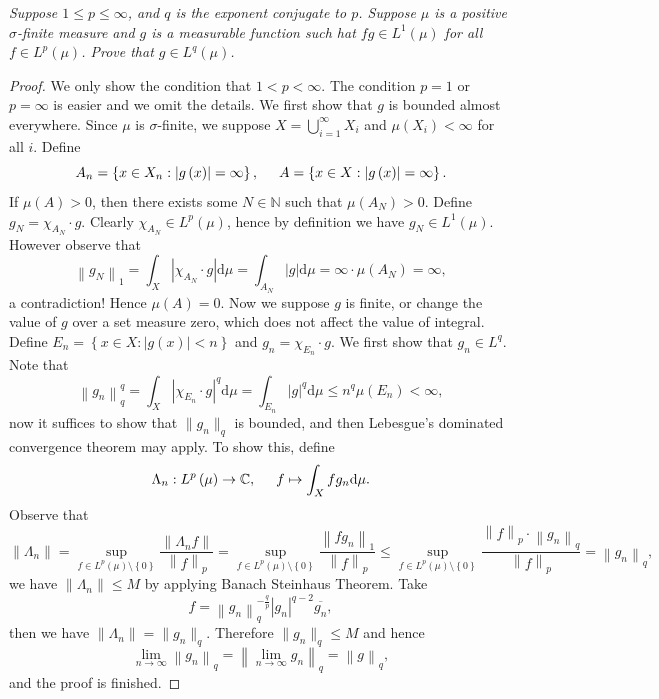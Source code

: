 \begin{problem}\em
Suppose $1\le p\le\infty$, and $q$ is the exponent conjugate to $p$. Suppose $\mu$ is a positive $\sigma$-finite measure and $g$ is a measurable function such hat $fg\in L^1(\mu)$ for all $f\in L^p(\mu)$. Prove that $g\in L^q(\mu)$.
\end{problem}
\begin{proof}
We only show the condition that $1<p<\infty$. The condition $p=1$ or $p=\infty$ is easier and we omit the details. We first show that $g$ is bounded almost everywhere. Since $\mu$ is $\sigma$-finite, we suppose $X=\bigcup_{i=1}^\infty X_i$ and $\mu(X_i)<\infty$ for all $i$. Define 
$$
A_n=\left\{ x\in X_n:\left| g\left( x \right) \right|=\infty \right\} ,\hspace{0.5cm}A=\left\{ x\in X:\left| g\left( x \right) \right|=\infty \right\} .
$$
If $\mu(A)>0$, then there exists some $N\in\mathbb{N}$ such that $\mu(A_N)>0$. Define $g_N=\chi_{A_N}\cdot g$. Clearly $\chi_{A_N}\in L^p(\mu)$, hence by definition we have $g_N\in L^1(\mu)$. However observe that 
$$
\left\| g_N \right\| _1=\int_X{\left| \chi _{A_N}\cdot g \right|\mathrm{d}\mu}=\int_{A_N}{\left| g \right|\mathrm{d}\mu}=\infty \cdot \mu \left( A_N \right) =\infty ,
$$
a contradiction! Hence $\mu(A)=0$. Now we suppose $g$ is finite, or change the value of $g$ over a set measure zero, which does not affect the value of integral. Define $E_n=\left\{ x\in X:\left| g\left( x \right) \right|<n\right\} $ and $g_n=\chi_{E_n}\cdot g$. We first show that $g_n\in L^q$. Note that 
$$
\left\| g_n \right\| _{q}^{q}=\int_X{\left| \chi _{E_n}\cdot g \right|^q\mathrm{d}\mu}=\int_{E_n}{\left| g \right|^q\mathrm{d}\mu}\le n^q\mu \left( E_n \right) <\infty ,
$$
now it suffices to show that $\|g_n\|_q$ is bounded, and then Lebesgue's dominated convergence theorem may apply. To show this, define 
$$
\Lambda_n :L^p\left( \mu \right) \rightarrow \mathbb{C} ,\hspace{0.5cm}f\mapsto \int_X{fg_n\mathrm{d}\mu}.
$$
Observe that 
$$
\left\| \Lambda _n \right\| =\mathop {\mathrm{sup}} \limits_{f\in L^p\left( \mu \right) \setminus \left\{ 0 \right\}}\frac{\left\| \Lambda _nf \right\|}{\left\| f \right\| _p}=\mathop {\mathrm{sup}} \limits_{f\in L^p\left( \mu \right) \setminus \left\{ 0 \right\}}\frac{\left\| fg_n \right\| _1}{\left\| f \right\| _p}\le \mathop {\mathrm{sup}} \limits_{f\in L^p\left( \mu \right) \setminus \left\{ 0 \right\}}\frac{\left\| f \right\| _p\cdot \left\| g_n \right\| _q}{\left\| f \right\| _p}=\left\| g_n \right\| _q,
$$
we have $\|\Lambda_n\|\le M$ by applying Banach Steinhaus Theorem. Take 
$$
f=\left\| g_n \right\| _{q}^{-\frac{q}{p}}\left| g_n \right|^{q-2}\overline{g_n},
$$
then we have $\|\Lambda_n\|=\|g_n\|_q$. Therefore $\|g_n\|_q\le M$ and hence 
$$
\lim_{n\rightarrow \infty} \left\| g_n \right\| _q=\left\| \lim_{n\rightarrow \infty} g_n \right\| _q=\left\| g \right\| _q,
$$
and the proof is finished.
\end{proof}
